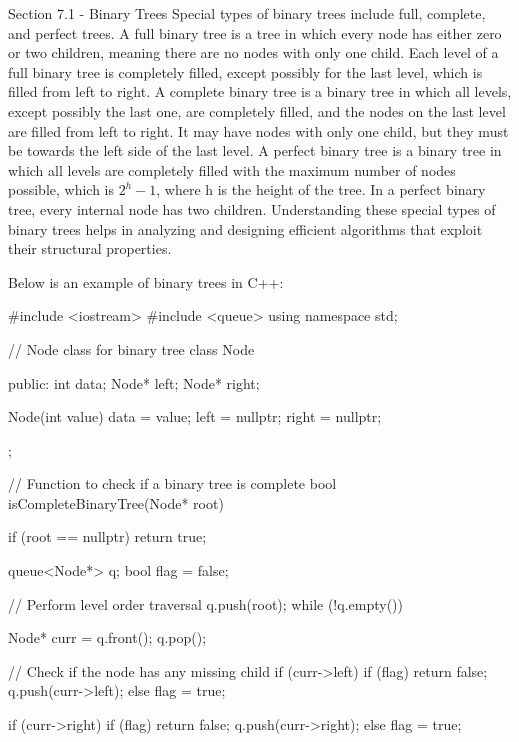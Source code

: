 \begin{notes}{Section 7.1 - Binary Trees}
    Special types of binary trees include full, complete, and perfect trees. A full binary tree is a tree in which every node has either zero or two children, meaning there are no nodes with only one child. Each level of a full binary tree is completely filled, except possibly for the last level, which is filled from left to right. 
    A complete binary tree is a binary tree in which all levels, except possibly the last one, are completely filled, and the nodes on the last level are filled from left to right. It may have nodes with only one child, but they must be towards the left side of the last level. A perfect binary tree is a binary tree in which all levels 
    are completely filled with the maximum number of nodes possible, which is $2^{h}-1$, where h is the height of the tree. In a perfect binary tree, every internal node has two children. Understanding these special types of binary trees helps in analyzing and designing efficient algorithms that exploit their structural properties.
    
    \begin{highlight}
        Below is an example of binary trees in C++:
    
    \begin{code}[C++]
    #include <iostream>
    #include <queue>
    using namespace std;
    
    // Node class for binary tree
    class Node {
    public:
        int data;
        Node* left;
        Node* right;
    
        Node(int value) {
            data = value;
            left = nullptr;
            right = nullptr;
        }
    };
    
    // Function to check if a binary tree is complete
    bool isCompleteBinaryTree(Node* root) {
        if (root == nullptr)
            return true;
        
        queue<Node*> q;
        bool flag = false;
        
        // Perform level order traversal
        q.push(root);
        while (!q.empty()) {
            Node* curr = q.front();
            q.pop();
    
            // Check if the node has any missing child
            if (curr->left) {
                if (flag)
                    return false;
                q.push(curr->left);
            }
            else
                flag = true;
        
            if (curr->right) {
                if (flag)
                    return false;
                q.push(curr->right);
            }
            else
                flag = true;
        }
        
}
\end{code}
\end{highlight}
\end{notes}
